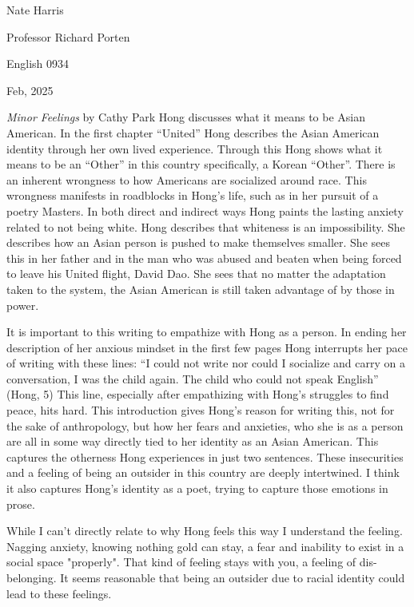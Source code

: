 \documentclass[
]{article}
\author{Nate Harris}
\date{2/28/2025}
\begin{document}
\noindent Nate Harris

\noindent Professor Richard Porten

\noindent English 0934

 Feb, 2025


\par
\emph{Minor Feelings} by Cathy Park Hong discusses what it means to be
Asian American. In the first chapter ``United'' Hong describes the Asian
American identity through her own lived experience. Through this Hong shows what it means
to be an ``Other'' in this country specifically, a Korean ``Other''.
There is an inherent wrongness to how Americans are socialized around
race. This wrongness manifests in roadblocks in Hong's life, such as in
her pursuit of a poetry Masters. In both direct and indirect ways Hong
paints the lasting anxiety related to not being white.
Hong describes that whiteness is an impossibility.
She describes how an Asian person is pushed to make themselves smaller.
She sees this in her father and in the man who was abused and beaten when being forced to leave his United flight, David Dao.
She sees that no matter the adaptation taken to the system, the Asian American is still taken advantage of by those in power.
\par
It is important to this writing to empathize with Hong as a person.
In ending her description of her anxious mindset in the first few pages Hong interrupts her pace of writing with these lines:
``I could not write nor could I socialize and carry on a conversation, I was the child again. The child who could not speak English'' (Hong, 5)
This line, especially after empathizing with Hong's struggles to find peace, hits hard.
This introduction gives Hong's reason for writing this, not for the sake of anthropology, but how her fears and anxieties, who she is as a person are all in some way directly tied to her identity as an Asian American.
This captures the otherness Hong experiences in just two sentences.
These insecurities and a feeling of being an outsider in this country are deeply intertwined. I think it also captures Hong's identity as a poet, trying to capture those emotions in prose.
\par
While I can't directly relate to why Hong feels this way I understand the feeling.
Nagging anxiety, knowing nothing gold can stay, a fear and inability to exist in a social space "properly". 
That kind of feeling stays with you, a feeling of dis-belonging. 
It seems reasonable that being an outsider due to racial identity could lead to these feelings.
\end{document}
